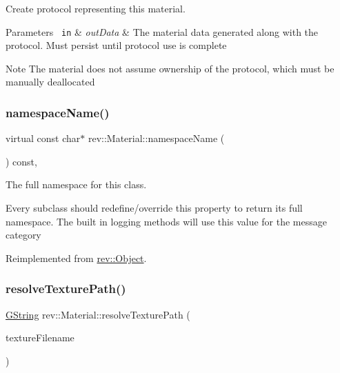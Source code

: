 Create protocol representing this material. 


\begin{DoxyParams}[1]{Parameters}
\mbox{\texttt{ in}}  & {\em out\+Data} & The material data generated along with the protocol. Must persist until protocol use is complete \\
\hline
\end{DoxyParams}
\begin{DoxyNote}{Note}
The material does not assume ownership of the protocol, which must be manually deallocated 
\end{DoxyNote}
\mbox{\label{classrev_1_1_material_abfa4020a52b5d7c82cc285f58a1fb0c5}} 
\subsubsection{\texorpdfstring{namespaceName()}{namespaceName()}}
{\footnotesize\ttfamily virtual const char$\ast$ rev\+::\+Material\+::namespace\+Name (\begin{DoxyParamCaption}{ }\end{DoxyParamCaption}) const\hspace{0.3cm}{\ttfamily [inline]}, {\ttfamily [virtual]}}



The full namespace for this class. 

Every subclass should redefine/override this property to return its full namespace. The built in logging methods will use this value for the message category 

Reimplemented from \mbox{\hyperlink{classrev_1_1_object_aaeb638d3e10f361c56c211a318a27f3d}{rev\+::\+Object}}.

\mbox{\label{classrev_1_1_material_ab9edd16de4df74b4529ba5b775ad5efe}} 
\subsubsection{\texorpdfstring{resolveTexturePath()}{resolveTexturePath()}}
{\footnotesize\ttfamily \mbox{\hyperlink{classrev_1_1_g_string}{G\+String}} rev\+::\+Material\+::resolve\+Texture\+Path (\begin{DoxyParamCaption}\item[{const \mbox{\hyperlink{classrev_1_1_g_string_view}{G\+String\+View}} \&}]{texture\+Filename }\end{DoxyParamCaption})\hspace{0.3cm}{\ttfamily [protected]}}



